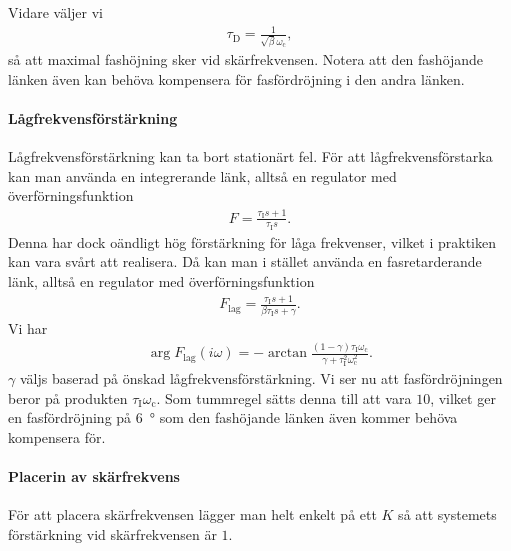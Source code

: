 Vidare väljer vi
\begin{align*}
	\tau_{\text{D}} = \frac{1}{\sqrt{\beta}\omega_{\text{c}}},
\end{align*}
så att maximal fashöjning sker vid skärfrekvensen. Notera att den fashöjande länken även kan behöva kompensera för fasfördröjning i den andra länken.

\paragraph{Lågfrekvensförstärkning}
Lågfrekvensförstärkning kan ta bort stationärt fel. För att lågfrekvensförstarka kan man använda en integrerande länk, alltså en regulator med överförningsfunktion
\begin{align*}
	F = \frac{\tau_{\text{I}}s + 1}{\tau_{\text{I}}s}.
\end{align*}
Denna har dock oändligt hög förstärkning för låga frekvenser, vilket i praktiken kan vara svårt att realisera. Då kan man i stället använda en fasretarderande länk, alltså en regulator med överförningsfunktion
\begin{align*}
	F_{\text{lag}} = \frac{\tau_{\text{I}}s + 1}{\beta\tau_{\text{I}}s + \gamma}.
\end{align*}
Vi har
\begin{align*}
	\arg{F_{\text{lag}}(i\omega)} = -\arctan{\frac{(1 - \gamma)\tau_{\text{I}}\omega_{\text{c}}}{\gamma + \tau_{\text{I}}^{2}\omega_{\text{c}}^{2}}}.
\end{align*}
$\gamma$ väljs baserad på önskad lågfrekvensförstärkning. Vi ser nu att fasfördröjningen beror på produkten $\tau_{\text{I}}\omega_{\text{c}}$. Som tummregel sätts denna till att vara $10$, vilket ger en fasfördröjning på \SI{6}{\degree} som den fashöjande länken även kommer behöva kompensera för.

\paragraph{Placerin av skärfrekvens}
För att placera skärfrekvensen lägger man helt enkelt på ett $K$ så att systemets förstärkning vid skärfrekvensen är $1$.